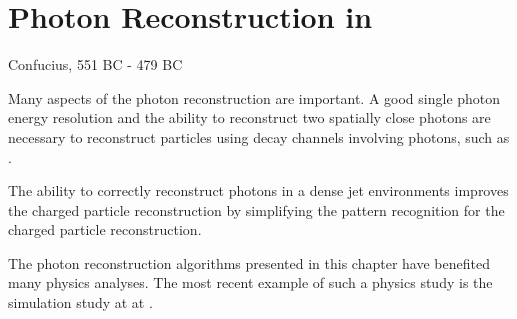 \chapter{Photon Reconstruction in \pandora}
\label{chap:Photon}

%
{Confucius, 551 BC - 479 BC}

Many aspects of the photon reconstruction are important. A good single photon energy resolution and the ability to reconstruct two spatially close photons are necessary to reconstruct particles using decay channels involving photons, such as \HepProcess{\Ppizero\to\Pgamma\Pgamma}.



The ability to correctly reconstruct photons in a dense jet environments improves the charged particle reconstruction by simplifying the  pattern recognition for the charged particle reconstruction.


The photon reconstruction algorithms presented in this chapter have benefited many physics analyses. The most recent example of such a physics study is the  \HepProcess{\PHiggs \to \Pgamma \Pgamma} simulation study at  at  \CLIC \cite{Kacarevic:higgsToGammaGamma}.

